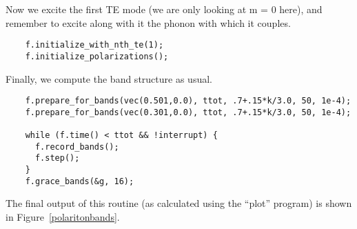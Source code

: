 Now we excite the first TE mode (we are only looking at m = 0 here), and
remember to excite along with it the phonon with which it couples.

\begin{verbatim}
    f.initialize_with_nth_te(1);
    f.initialize_polarizations();
\end{verbatim}

Finally, we compute the band structure as usual.

\begin{verbatim}
    f.prepare_for_bands(vec(0.501,0.0), ttot, .7+.15*k/3.0, 50, 1e-4);
    f.prepare_for_bands(vec(0.301,0.0), ttot, .7+.15*k/3.0, 50, 1e-4);
    
    while (f.time() < ttot && !interrupt) {
      f.record_bands();
      f.step();
    }
    f.grace_bands(&g, 16);
\end{verbatim}
\begin{comment}
  }
}
\end{comment}

The final output of this routine (as calculated using the ``plot'' program)
is shown in Figure~\ref{polaritonbands}.